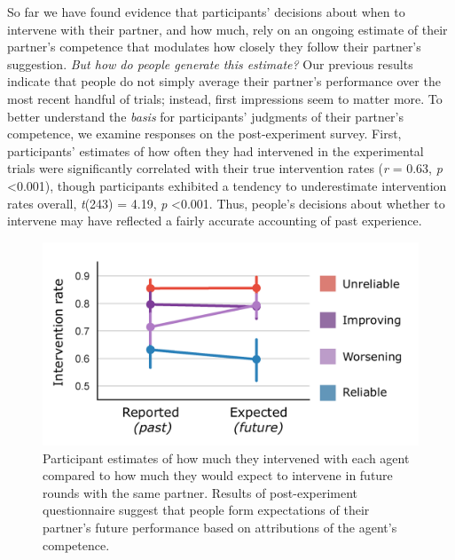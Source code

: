 \documentclass[10pt,letterpaper]{article}
\begin{document}
So far we have found evidence that participants' decisions about when to intervene with their partner, and how much, rely on an ongoing estimate of their partner's competence that modulates how closely they follow their partner's suggestion. \textit{But how do people generate this estimate?} Our previous results indicate that people do not simply average their partner's performance over the most recent handful of trials; instead, first impressions seem to matter more. To better understand the \textit{basis} for participants' judgments of their partner's competence, we examine responses on the post-experiment survey. First, participants' estimates of how often they had intervened in the experimental trials were significantly correlated with their true intervention rates (\textit{r} = 0.63, \textit{p} \textless{0.001}), though participants exhibited a tendency to underestimate intervention rates overall, \textit{t}(243) = 4.19, \textit{p} \textless{0.001}. Thus, people's decisions about whether to intervene may have reflected a fairly accurate accounting of past experience. 



\begin{figure}[H]
\begin{center}
\includegraphics[width=0.9\linewidth]{img/survey_intervention_expectations_clean.pdf}
\end{center}
\caption{Participant estimates of how much they intervened with each agent compared to how much they would expect to intervene in future rounds with the same partner. Results of post-experiment questionnaire suggest that people form expectations of their partner's future performance based on attributions of the agent's competence.} 
\label{fig:survey}
\end{figure}
\end{document}
